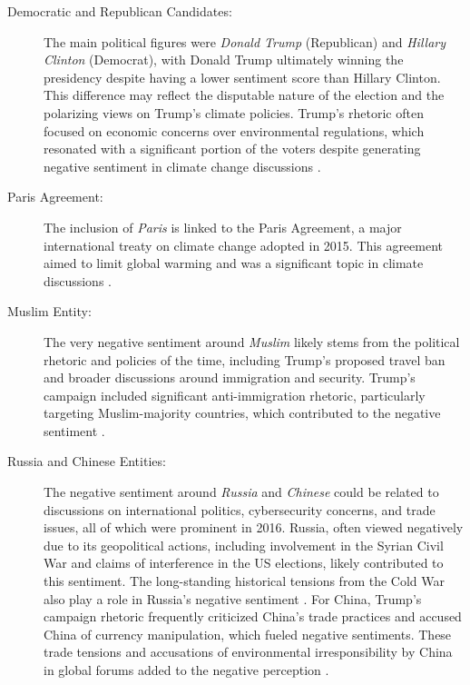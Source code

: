 \begin{description}
    \item[Democratic and Republican Candidates:] The main political figures were \emph{Donald Trump} (Republican) and \emph{Hillary Clinton} (Democrat), with Donald Trump ultimately winning the presidency despite having a lower sentiment score than Hillary Clinton. This difference may reflect the disputable nature of the election and the polarizing views on Trump's climate policies. Trump's rhetoric often focused on economic concerns over environmental regulations, which resonated with a significant portion of the voters despite generating negative sentiment in climate change discussions \cite{bbc2016trump}.
    \item[Paris Agreement:] The inclusion of \emph{Paris} is linked to the Paris Agreement, a major international treaty on climate change adopted in 2015. This agreement aimed to limit global warming and was a significant topic in climate discussions \cite{UN2019}.
    \item[Muslim Entity:] The very negative sentiment around \emph{Muslim} likely stems from the political rhetoric and policies of the time, including Trump's proposed travel ban and broader discussions around immigration and security. Trump's campaign included significant anti-immigration rhetoric, particularly targeting Muslim-majority countries, which contributed to the negative sentiment \cite{Gottfried_2023}.
    \item[Russia and Chinese Entities:] The negative sentiment around \emph{Russia} and  \emph{Chinese} could be related to discussions on international politics, cybersecurity concerns, and trade issues, all of which were prominent in 2016. Russia, often viewed negatively due to its geopolitical actions, including involvement in the Syrian Civil War and claims of interference in the US elections, likely contributed to this sentiment. The long-standing historical tensions from the Cold War also play a role in Russia's negative sentiment \cite{Ziegler2018}. For China, Trump's campaign rhetoric frequently criticized China's trade practices and accused China of currency manipulation, which fueled negative sentiments. These trade tensions and accusations of environmental irresponsibility by China in global forums added to the negative perception \cite{Steinbock2018}.
\end{description}

